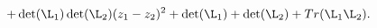 \begin{equation}\label{det}
+\det(\L_1)\det(\L_2)(z_1-z_2)^2+\det(\L_1)+\det(\L_2)+Tr(\L_1\L_2).
\end{equation}

